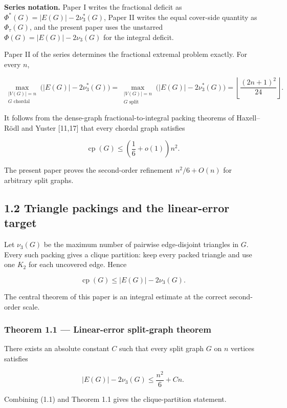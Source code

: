 \documentclass[english,11pt,a4paper]{article}
\begin{document}
\textbf{Series notation.} Paper I writes the fractional deficit as
\(\Phi^*(G)=|E(G)|-2\nu_3^*(G)\), Paper II writes the equal cover-side
quantity as \(\Phi_\tau(G)\), and the present paper uses the unstarred
\(\Phi(G)=|E(G)|-2\nu_3(G)\) for the integral deficit.

Paper II of the series determines the fractional extremal problem
exactly. For every \(n\),

\[
\max_{\substack{|V(G)|=n\\G\text{ chordal}}}
\bigl(|E(G)|-2\nu_3^*(G)\bigr)
=
\max_{\substack{|V(G)|=n\\G\text{ split}}}
\bigl(|E(G)|-2\nu_3^*(G)\bigr)
=
\left\lfloor\frac{(2n+1)^2}{24}\right\rfloor.
\]

It follows from the dense-graph fractional-to-integral packing theorems
of Haxell--Rödl and Yuster {[}11,17{]} that every chordal graph
satisfies

\[
\operatorname{cp}(G)
\le
\left(\frac16+o(1)\right)n^2.
\]

The present paper proves the second-order refinement \(n^2/6+O(n)\) for
arbitrary split graphs.

\subsection{1.2 Triangle packings and the linear-error
target}\label{triangle-packings-and-the-linear-error-target}

Let \(\nu_3(G)\) be the maximum number of pairwise edge-disjoint
triangles in \(G\). Every such packing gives a clique partition: keep
every packed triangle and use one \(K_2\) for each uncovered edge. Hence

\[
\operatorname{cp}(G)
\le
|E(G)|-2\nu_3(G).
\tag{1.1}
\]

The central theorem of this paper is an integral estimate at the correct
second-order scale.

\subsubsection{Theorem 1.1 --- Linear-error split-graph
theorem}\label{theorem-1.1-linear-error-split-graph-theorem}

There exists an absolute constant \(C\) such that every split graph
\(G\) on \(n\) vertices satisfies

\[
\boxed{
|E(G)|-2\nu_3(G)
\le
\frac{n^2}{6}+Cn
}.
\tag{1.2}
\]

Combining (1.1) and Theorem 1.1 gives the clique-partition statement.
\end{document}
